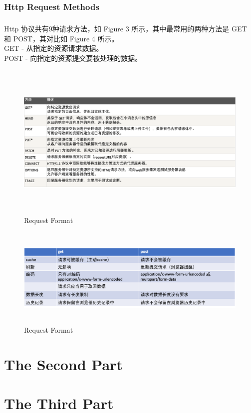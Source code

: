 \documentclass{article}
\begin{document}
	\subsubsection{Http Request Methods}
	\subparagraph{}
	\begin{CJK}{UTF8}{gbsn}
		Http 协议共有9种请求方法，如 Figure 3 所示，其中最常用的两种方法是 GET 和 POST，其对比如 Figure 4 所示。\\
		GET - 从指定的资源请求数据。\\
		POST - 向指定的资源提交要被处理的数据。
	\end{CJK}{}
	\begin{figure}[H]
		\centering
		\includegraphics[height = 7.6cm, width = 16cm]{pics/4_9ways_of_http_request.png}	
		\caption{Request Format}
	\end{figure}
	\begin{figure}[H]
		\centering
		\includegraphics[height = 4.8cm, width = 15cm]{pics/5_get_post.png}	
		\caption{Request Format}
	\end{figure}
	\clearpage
	\section{The Second Part}
	\clearpage
	\section{The Third Part}
\end{document}
